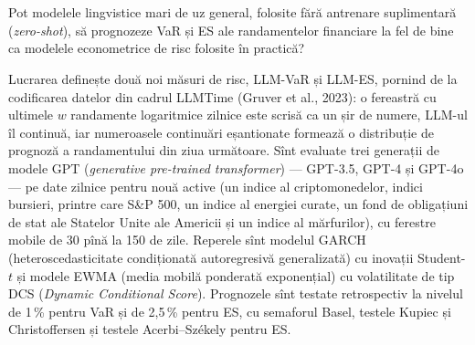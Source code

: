 \section{}
\textbf{} %
{Pot modelele lingvistice mari de uz general, folosite fără antrenare suplimentară (\emph{zero-shot}), să prognozeze VaR și ES ale randamentelor financiare la fel de bine ca modelele econometrice de risc folosite în practică?}

\textbf{} %
{Lucrarea definește două noi măsuri de risc, LLM-VaR și LLM-ES, pornind de la codificarea datelor din cadrul LLMTime (Gruver et al., 2023): o fereastră cu ultimele $w$ randamente logaritmice zilnice este scrisă ca un șir de numere, LLM-ul îl continuă, iar numeroasele continuări eșantionate formează o distribuție de prognoză a randamentului din ziua următoare.
Sînt evaluate trei generații de modele GPT (\emph{generative pre-trained transformer}) --- GPT-3.5, GPT-4 și GPT-4o --- pe date zilnice pentru nouă active (un indice al criptomonedelor, indici bursieri, printre care S\&P 500, un indice al energiei curate, un fond de obligațiuni de stat ale Statelor Unite ale Americii și un indice al mărfurilor), cu ferestre mobile de 30 pînă la 150 de zile.
Reperele sînt modelul GARCH (heteroscedasticitate condiționată autoregresivă generalizată) cu inovații Student-$t$ și modele EWMA (media mobilă ponderată exponențial) cu volatilitate de tip DCS (\emph{Dynamic Conditional Score}).
Prognozele sînt testate retrospectiv la nivelul de 1\,\% pentru VaR și de 2,5\,\% pentru ES, cu semaforul Basel, testele Kupiec și Christoffersen și testele Acerbi--Székely pentru ES.}

